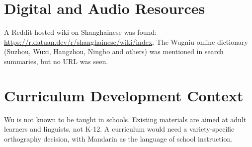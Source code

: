 \documentclass[12pt]{article}
\begin{document}
\section{Digital and Audio Resources}
A Reddit-hosted wiki on Shanghainese was found: \url{https://r.datuan.dev/r/shanghainese/wiki/index}. The Wugniu online dictionary (Suzhou, Wuxi, Hangzhou, Ningbo and others) was mentioned in search summaries, but no URL was seen.

\section{Curriculum Development Context}
Wu is not known to be taught in schools. Existing materials are aimed at adult learners and linguists, not K-12. A curriculum would need a variety-specific orthography decision, with Mandarin as the language of school instruction.
\end{document}
